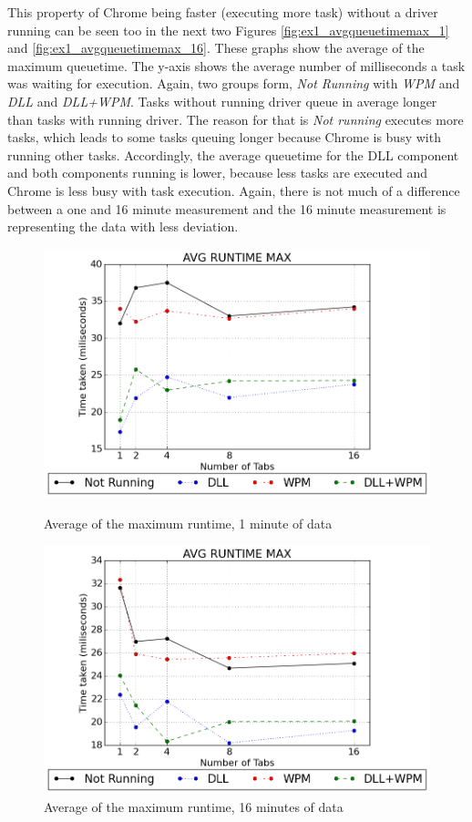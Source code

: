 This property of Chrome being faster (executing more task) without a driver running can be seen too in the next two Figures \ref{fig:ex1_avgqueuetimemax_1} and \ref{fig:ex1_avgqueuetimemax_16}. These graphs show the average of the maximum queuetime. The y-axis shows the average number of milliseconds a task was waiting for execution. Again, two groups form, \emph{Not Running} with \emph{\gls{WPM}} and \emph{\gls{DLL}} and \emph{\gls{DLL}+\gls{WPM}}. Tasks without running driver queue in average longer than tasks with running driver. The reason for that is \emph{Not running} executes more tasks, which leads to some tasks queuing longer because Chrome is busy with running other tasks. Accordingly, the average queuetime for the \gls{DLL} component and both components running is lower, because less tasks are executed and Chrome is less busy with task execution. Again, there is not much of a difference between a one and 16 minute measurement and the 16 minute measurement is representing the data with less deviation.
\begin{figure}[!htbp]
	\centering
    \includegraphics[width=\textwidth,height=0.45\textheight,keepaspectratio]{Evaluation/experiment1/AVG-RUNTIME-MAX-1.png}
    \caption{Average of the maximum runtime, 1 minute of data}
    \label{fig:ex1_avgruntimemax_1}
    
  	\vspace*{\floatsep}    
    
    \includegraphics[width=\textwidth,height=0.45\textheight,keepaspectratio]{Evaluation/experiment1/AVG-RUNTIME-MAX-16.png}
    \caption{Average of the maximum runtime, 16 minutes of data}
    \label{fig:ex1_avgruntimemax_16}
\end{figure}
